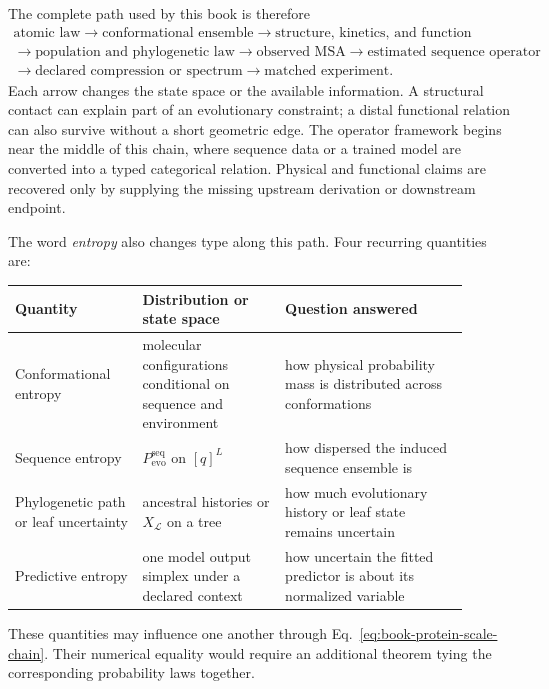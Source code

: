 The complete path used by this book is therefore
\begin{equation}
\boxed{
\begin{gathered}
\text{atomic law}
\longrightarrow\text{conformational ensemble}
\longrightarrow\text{structure, kinetics, and function}\\
\longrightarrow\text{population and phylogenetic law}
\longrightarrow\text{observed MSA}
\longrightarrow\text{estimated sequence operator}\\
\longrightarrow\text{declared compression or spectrum}
\longrightarrow\text{matched experiment}.
\end{gathered}}
\label{eq:book-protein-scale-chain}
\end{equation}
Each arrow changes the state space or the available information.  A structural contact can explain
part of an evolutionary constraint; a distal functional relation can also survive without a short
geometric edge.  The operator framework begins near the middle of this chain, where sequence data
or a trained model are converted into a typed categorical relation.  Physical and functional
claims are recovered only by supplying the missing upstream derivation or downstream endpoint.

The word \emph{entropy} also changes type along this path.  Four recurring quantities are:
\begin{center}
\small
\begin{tabular}{@{}>{\raggedright\arraybackslash}p{0.25\linewidth}
                >{\raggedright\arraybackslash}p{0.29\linewidth}
                >{\raggedright\arraybackslash}p{0.36\linewidth}@{}}
\toprule
Quantity & Distribution or state space & Question answered \\
\midrule
Conformational entropy & molecular configurations conditional on sequence and environment & how physical probability mass is distributed across conformations \\
Sequence entropy & $P_{\mathrm{evo}}^{\mathrm{seq}}$ on $[q]^L$ & how dispersed the induced sequence ensemble is \\
Phylogenetic path or leaf uncertainty & ancestral histories or $X_{\mathcal L}$ on a tree & how much evolutionary history or leaf state remains uncertain \\
Predictive entropy & one model output simplex under a declared context & how uncertain the fitted predictor is about its normalized variable \\
\bottomrule
\end{tabular}
\end{center}
These quantities may influence one another through Eq.~\ref{eq:book-protein-scale-chain}.  Their
numerical equality would require an additional theorem tying the corresponding probability laws
together.

